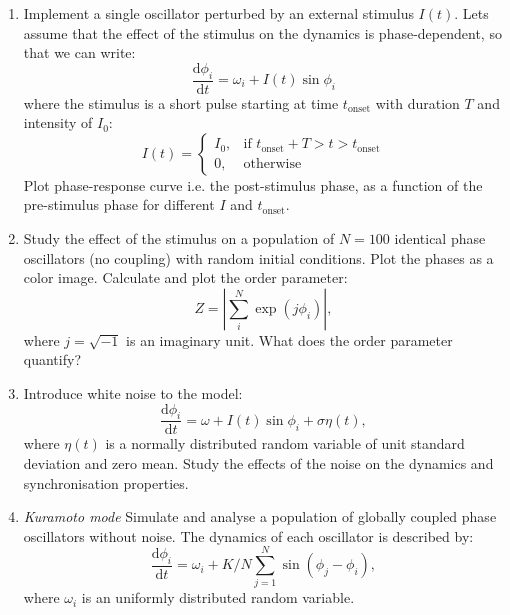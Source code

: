 \documentclass[12pt]{article}
\newcommand{\tderiv}[1]{\frac{\mathrm{d}#1}{\mathrm{d}t}}
\begin{document}
\begin{enumerate}
    \item Implement a single oscillator perturbed by an external
        stimulus $I(t)$. Lets assume that the effect of the stimulus
         on the dynamics is phase-dependent,
        so that we can write:
        \begin{equation}
            \tderiv{\phi_i} = \omega_i + I(t) \sin{\phi_i}
            \label{<++>}
        \end{equation}
        where the stimulus is a short pulse starting at time
        $t_\mathrm{onset}$ with duration $T$ and intensity of $I_0$:
        \begin{equation}
          I(t)=
          \begin{cases}
              I_0, & \text{if } t_\mathrm{onset}+T>t>t_{\mathrm{onset}} \\
              0, & \text{otherwise} 
          \end{cases}
            \label{eq:stimulus}
        \end{equation}
        Plot phase-response curve i.e. the post-stimulus phase, as a
        function of the pre-stimulus phase for different $I$ and
        $t_\mathrm{onset}$.
    \item Study the effect of the stimulus on a population of
        $N=100$ identical phase oscillators (no coupling) with random initial
        conditions. Plot the phases as a color image. Calculate and
        plot the order parameter:
        \begin{equation}
            Z = \left|{\sum_i^N \exp{(j\phi_i)}}\right|,
            \label{eq:order_parameter}
        \end{equation}
        where $j=\sqrt{-1}$ is an imaginary unit. What does the
        order parameter quantify?
    \item Introduce white noise to the model:
        \begin{equation}
            \tderiv{\phi_i} = \omega + I(t)\sin{\phi_i} + \sigma \eta(t),
            \label{eq:phase_with_noise}
        \end{equation}
        where $\eta(t)$ is a normally distributed random variable of
        unit standard deviation and zero mean. Study the effects of
        the noise on the dynamics and synchronisation properties.
    \item \textit{Kuramoto mode} Simulate and analyse a population of
        globally coupled phase oscillators without noise. The dynamics of each
        oscillator is described by:
        \begin{equation}
            \tderiv{\phi_i} = \omega_i + K/N\sum_{j=1}^N\sin(\phi_j-\phi_i),
            \label{eq:kuramoto}
        \end{equation}
        where $\omega_i$ is an uniformly distributed random variable.


\end{enumerate}
\end{document}
